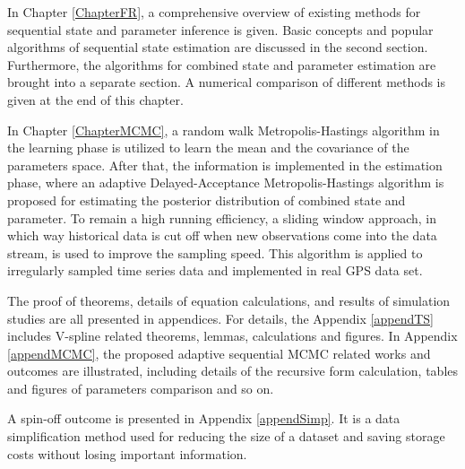 In Chapter \ref{ChapterFR}, a comprehensive overview of existing methods for sequential state and parameter inference is given. Basic concepts and popular algorithms of sequential state estimation are discussed in the second section. Furthermore, the algorithms for combined state and parameter estimation are brought into a separate section. A numerical comparison of different methods is given at the end of this chapter. 

In Chapter \ref{ChapterMCMC}, a random walk Metropolis-Hastings algorithm in the learning phase is utilized to learn the mean and the covariance of the parameters space. After that, the information is implemented in the estimation phase, where an adaptive Delayed-Acceptance Metropolis-Hastings algorithm is proposed for estimating the posterior distribution of combined state and parameter. To remain a high running efficiency, a sliding window approach, in which way historical data is cut off when new observations come into the data stream, is used to improve the sampling speed. This algorithm is applied to irregularly sampled time series data and implemented in real GPS data set. 

The proof of theorems, details of equation calculations, and results of simulation studies are all presented in appendices. For details, the Appendix \ref{appendTS} includes V-spline related theorems, lemmas, calculations and figures. In Appendix \ref{appendMCMC}, the proposed adaptive sequential MCMC related works and outcomes are illustrated, including details of the recursive form calculation, tables and figures of parameters comparison and so on. 

A spin-off outcome is presented in Appendix \ref{appendSimp}. It is a data simplification method used for reducing the size of a dataset and saving storage costs without losing important information.






